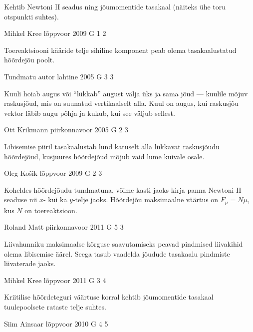 \documentclass[11pt]{article}
\begin{document}
{{\ifHint
Kehtib Newtoni II seadus ning jõumomentide tasakaal (näiteks ühe toru otspunkti suhtes).
\fi
}

{Mihkel Kree} %
{lõppvoor} %
{2009} %
{G 1} %
{2} %
{

\ifHint
Toereaktsiooni kääride telje sihiline komponent peab olema tasakaalustatud hõõrdejõu poolt.
\fi
}

{Tundmatu autor} %
{lahtine} %
{2005} %
{G 3} %
{3} %
{

\ifHint
Kuuli hoiab augus või \enquote{lükkab} august välja üks ja sama jõud --- kuulile mõjuv raskusjõud, mis on suunatud vertikaalselt alla. Kuul on augus, kui raskusjõu vektor läbib augu põhja ja kukub, kui see väljub sellest.
\fi
}

{Ott Krikmann} %
{piirkonnavoor} %
{2005} %
{G 2} %
{3} %
{

\ifHint
Libisemise piiril tasakaalustab lund katuselt alla lükkavat raskusjõudu hõõrdejõud, kusjuures hõõrdejõud mõjub vaid lume kuivale osale.
\fi
}

{Oleg Košik} %
{lõppvoor} %
{2009} %
{G 2} %
{3} %
{

\ifHint
Koheldes hõõrdejõudu tundmatuna, võime kasti jaoks kirja panna Newtoni II seaduse nii $x$- kui ka $y$-telje jaoks. Hõõrdejõu maksimaalne väärtus on $F_\mu = N\mu$, kus $N$ on toereaktsioon.
\fi
}

{Roland Matt} %
{piirkonnavoor} %
{2011} %
{G 5} %
{3} %
{

\ifHint
Liivahunniku maksimaalse kõrguse saavutamiseks peavad pindmised liivakihid
olema libisemise äärel. Seega tasub vaadelda jõudude tasakaalu pindmiste liivaterade jaoks.
\fi
}

{Mihkel Kree} %
{lõppvoor} %
{2011} %
{G 3} %
{4} %
{

\ifHint
Kriitilise hõõrdeteguri väärtuse korral kehtib jõumomentide tasakaal tuulepoolsete rataste telje suhtes.
\fi
}

{Siim Ainsaar} %
{lõppvoor} %
{2010} %
{G 4} %
{5} %
{

}}
\end{document}
